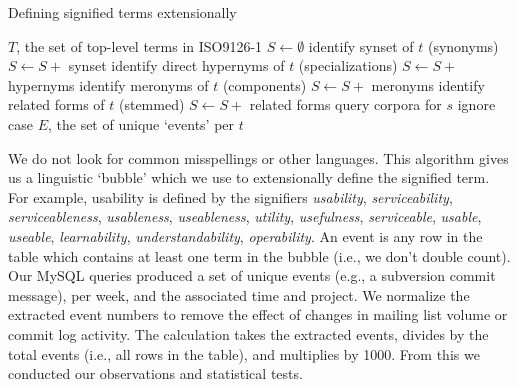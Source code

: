 \documentclass[conference, compsoc]{IEEEtran}
\begin{document}
\renewcommand{\algorithmiccomment}[1]{// #1}
\begin{algorithm}[ht]
\caption{Defining signified terms extensionally}
  \label{alg1}
\begin{algorithmic}
	\REQUIRE $T$, the set of top-level terms in ISO9126-1
	\STATE $S \leftarrow \emptyset $
	\STATE identify synset of $t$ (synonyms)%
	\STATE $S \leftarrow S +$ synset
	\STATE identify direct hypernyms of $t$ (specializations)%
	\STATE $S \leftarrow S +$ hypernyms %
	\STATE identify meronyms of $t$ (components)%
	\STATE $S \leftarrow S +$ meronyms %
	\STATE identify related forms of $t$ (stemmed)%
	\STATE $S \leftarrow S +$ related forms
		\STATE query corpora for $s$
		\COMMENT ignore case
	\ENDFOR
  \ENDFOR
\RETURN $E$, the set of unique `events' per $t$

\end{algorithmic}
\end{algorithm}
We do not look for common misspellings or other languages. This algorithm gives us a linguistic `bubble' which we use to extensionally define the signified term. For example, usability is defined by the signifiers \emph{usability}, \emph{serviceability},  \emph{serviceableness},  \emph{usableness}, \emph{useableness},  \emph{utility},  \emph{usefulness},  \emph{serviceable},  \emph{usable},  \emph{useable},  \emph{learnability},  \emph{understandability},  \emph{operability}. An event is any row in the table which contains at least one term in the bubble (i.e., we don't double count). Our MySQL queries produced a set of unique events (e.g., a subversion commit message), per week, and the associated time and project. We normalize the extracted event numbers to remove the effect of changes in mailing list volume or commit log activity. The calculation takes the extracted events, divides by the total events (i.e., all rows in the table), and multiplies by 1000. From this we conducted our observations and statistical tests.
% 
\end{document}
